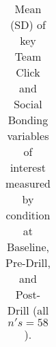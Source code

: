 \begin{table}[]
\begin{tabular}{@{}rcccccc@{}}
  \end{tabular}
\caption{Mean (SD) of key Team Click and Social Bonding variables of interest measured by condition at Baseline, Pre-Drill, and Post-Drill (all $n's = 58$).}
\label{tab:rawClickBond}
\end{table}
